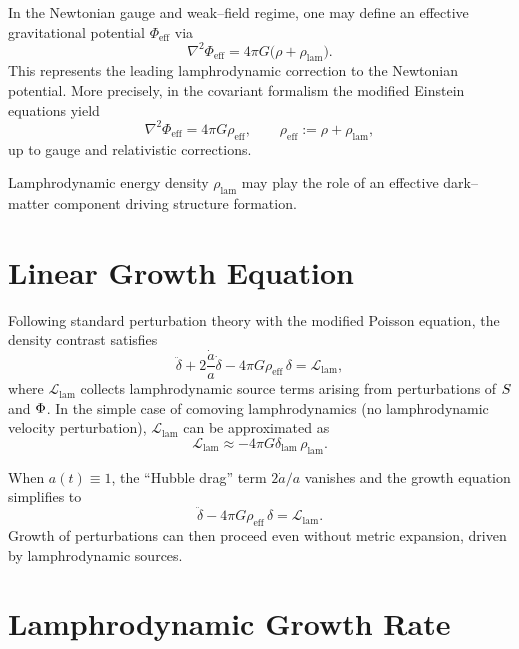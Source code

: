 In the Newtonian gauge and weak--field regime, one may define an
effective gravitational potential $\Phi_{\mathrm{eff}}$ via
\[
  \nabla^2 \Phi_{\mathrm{eff}}
  = 4\pi G \bigl( \rho + \rho_{\mathrm{lam}} \bigr).
\]
This represents the leading lamphrodynamic correction to the Newtonian
potential. More precisely, in the covariant formalism the modified
Einstein equations yield
\[
  \nabla^2\Phi_{\mathrm{eff}}
  = 4\pi G \rho_{\mathrm{eff}},
\qquad
  \rho_{\mathrm{eff}}
  := \rho + \rho_{\mathrm{lam}},
\]
up to gauge and relativistic corrections.

\begin{remark}
Lamphrodynamic energy density $\rho_{\mathrm{lam}}$ may play the role of an
effective dark--matter component driving structure formation.
\end{remark}

\section{Linear Growth Equation}

Following standard perturbation theory with the modified Poisson equation,
the density contrast satisfies
\begin{equation}
\label{eq:growth-equation}
  \ddot{\delta}
  + 2\frac{\dot{a}}{a}\dot{\delta}
  - 4\pi G \rho_{\mathrm{eff}}\,\delta
  = \mathcal{L}_{\mathrm{lam}},
\end{equation}
where $\mathcal{L}_{\mathrm{lam}}$ collects lamphrodynamic source terms
arising from perturbations of $S$ and $\Phi$. In the simple
case of comoving lamphrodynamics (no lamphrodynamic velocity perturbation),
$\mathcal{L}_{\mathrm{lam}}$ can be approximated as
\[
  \mathcal{L}_{\mathrm{lam}}
  \approx -4\pi G\delta_{\mathrm{lam}}\,\rho_{\mathrm{lam}}.
\]

When $a(t)\equiv 1$, the ``Hubble drag'' term $2\dot{a}/a$ vanishes and the
growth equation simplifies to
\begin{equation}
\label{eq:growth-no-expansion}
  \ddot{\delta}
  - 4\pi G \rho_{\mathrm{eff}}\,\delta
  = \mathcal{L}_{\mathrm{lam}}.
\end{equation}
Growth of perturbations can then proceed even without metric expansion,
driven by lamphrodynamic sources.

\section{Lamphrodynamic Growth Rate}

